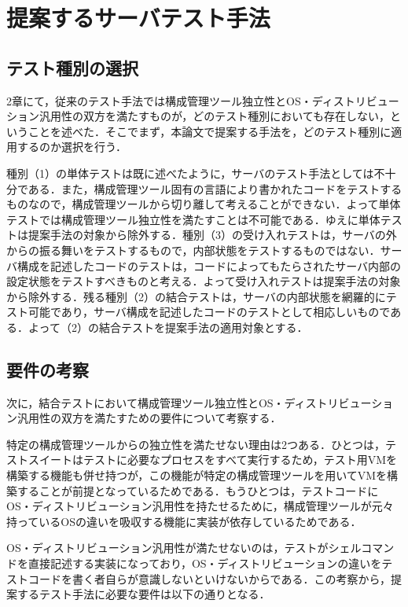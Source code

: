 \section{提案するサーバテスト手法}

\subsection{テスト種別の選択}

2章にて，従来のテスト手法では構成管理ツール独立性とOS・ディストリビューション汎用性の双方を満たすものが，どのテスト種別においても存在しない，ということを述べた．そこでまず，本論文で提案する手法を，どのテスト種別に適用するのか選択を行う．

種別（1）の単体テストは既に述べたように，サーバのテスト手法としては不十分である．また，構成管理ツール固有の言語により書かれたコードをテストするものなので，構成管理ツールから切り離して考えることができない．よって単体テストでは構成管理ツール独立性を満たすことは不可能である．ゆえに単体テストは提案手法の対象から除外する．種別（3）の受け入れテストは，サーバの外からの振る舞いをテストするもので，内部状態をテストするものではない．サーバ構成を記述したコードのテストは，コードによってもたらされたサーバ内部の設定状態をテストすべきものと考える．よって受け入れテストは提案手法の対象から除外する．残る種別（2）の結合テストは，サーバの内部状態を網羅的にテスト可能であり，サーバ構成を記述したコードのテストとして相応しいものである．よって（2）の結合テストを提案手法の適用対象とする．

\subsection{要件の考察}

次に，結合テストにおいて構成管理ツール独立性とOS・ディストリビューション汎用性の双方を満たすための要件について考察する．

特定の構成管理ツールからの独立性を満たせない理由は2つある．ひとつは，テストスイートはテストに必要なプロセスをすべて実行するため，テスト用VMを構築する機能も併せ持つが，この機能が特定の構成管理ツールを用いてVMを構築することが前提となっているためである．もうひとつは，テストコードにOS・ディストリビューション汎用性を持たせるために，構成管理ツールが元々持っているOSの違いを吸収する機能に実装が依存しているためである．

OS・ディストリビューション汎用性が満たせないのは，テストがシェルコマンドを直接記述する実装になっており，OS・ディストリビューションの違いをテストコードを書く者自らが意識しないといけないからである．この考察から，提案するテスト手法に必要な要件は以下の通りとなる．

